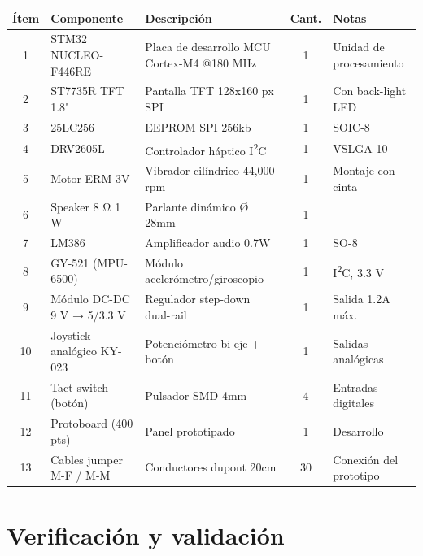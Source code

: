 \documentclass[11pt,a4paper]{article}
\begin{document}
\begin{longtable}{|c|p{4cm}|p{4.5cm}|c|p{3cm}|}
\hline
\rowcolor[HTML]{C0C0C0}
\textbf{Ítem} & \textbf{Componente} & \textbf{Descripción} & \textbf{Cant.} & \textbf{Notas} \\
\hline
1  & STM32 NUCLEO-F446RE             & Placa de desarrollo MCU Cortex-M4 @180 MHz         & 1 & Unidad de procesamiento \\ \hline
2  & ST7735R TFT 1.8"     & Pantalla TFT 128x160 px SPI                         & 1 & Con back-light LED \\ \hline
3  & 25LC256                         & EEPROM SPI 256kb                     & 1 & SOIC-8 \\ \hline
4  & DRV2605L                        & Controlador háptico I\textsuperscript{2}C           & 1 & VSLGA-10 \\ \hline
5  & Motor ERM {3}{\si\volt}         & Vibrador cilíndrico {44,000} rpm               & 1 & Montaje con cinta \\ \hline
6  & Speaker 8 Ω 1 W                 & Parlante dinámico Ø {28}{\si\mm}          & 1 &  \\ \hline %
7  & LM386                            & Amplificador audio {0.7}{\si\watt}                 & 1 & SO-8 \\ \hline
8  & GY-521 (MPU-6500)               & Módulo acelerómetro/giroscopio                     & 1 & I\textsuperscript{2}C, 3.3 V \\ \hline
9  & Módulo DC-DC 9 V → 5/3.3 V      & Regulador step-down dual-rail                      & 1 & Salida {1.2}{\si\ampere} máx. \\ \hline
10 & Joystick analógico KY-023       & Potenciómetro bi-eje + botón                       & 1 & Salidas analógicas \\ \hline
11 & Tact switch (botón)             & Pulsador SMD {4}{\si\mm}                  & 4 & Entradas digitales \\ \hline
12 & Protoboard (400 pts)            & Panel prototipado                          & 1 & Desarrollo \\ \hline
13 & Cables jumper M-F / M-M         & Conductores dupont {20}{\si\cm}           & 30 & Conexión del prototipo \\ \hline
\end{longtable}

\section{Verificación y validación}
\end{document}
